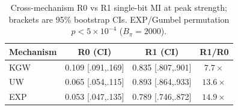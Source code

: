 \begin{table}[t]
\centering
\small
\caption{Cross-mechanism R0 vs R1 single-bit MI at peak strength;
brackets are 95\% bootstrap CIs. EXP/Gumbel permutation $p<5{\times}10^{-4}$
($B_\pi{=}2000$).}
\label{tab:cross_mech}
\setlength{\tabcolsep}{4pt}
\begin{tabular}{l c c c}
\toprule
Mechanism & R0 (CI) & R1 (CI) & R1/R0 \\
\midrule
KGW & 0.109 [.091,.169] & 0.835 [.807,.901] & $7.7\times$ \\
UW  & 0.065 [.054,.115] & 0.893 [.864,.933] & $13.6\times$ \\
EXP & 0.053 [.047,.135] & 0.789 [.746,.872] & $14.9\times$ \\
\bottomrule
\end{tabular}
\end{table}
